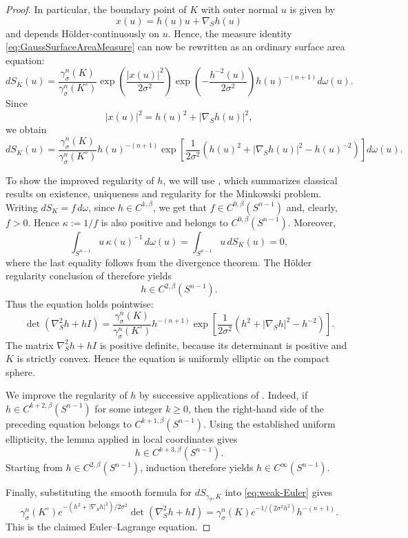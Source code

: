 \documentclass[12pt,oneside,reqno]{amsart}
\numberwithin{equation}{section}
\theoremstyle{remark}
\begin{document}
\begin{proof}
In particular, the boundary point of $K$ with outer
normal \(u\) is given by
\[
        x(u)=h(u)u+\nabla_Sh(u)
\]
and depends Hölder-continuously on \(u\). Hence, the measure identity \eqref{eq:GaussSurfaceAreaMeasure} can now be rewritten as an ordinary surface area
equation:
\[
        dS_{K}(u)
        =
        \frac{\gamma_\sigma^n(K)}{\gamma_\sigma^n(K^\circ)} 
        \exp\left( \frac{|x(u)|^2}{2\sigma^2}\right)
        \exp\left(-\frac{h^{-2}(u)}{2\sigma^2} \right)
        h(u)^{-(n+1)}
        d\omega(u).
\]
Since
\[
        |x(u)|^2=h(u)^2+|\nabla_Sh(u)|^2,
\]
we obtain
\[
        dS_{K}(u) =
        \frac{\gamma_\sigma^n(K)}{\gamma_\sigma^n(K^\circ)}
        h(u)^{-(n+1)}
        \exp\left[
        \frac{1}{2\sigma^2}
        \left(
        h(u)^2+|\nabla_Sh(u)|^2-h(u)^{-2}
        \right)
        \right] d\omega (u).
\]

To show the improved regularity of $h$, we will use \cite[Theorem~4.5]{trudinger2008monge}, which summarizes classical results on existence, uniqueness and regularity for the Minkowski problem. 
Writing \(dS_K=f\,d\omega\), since \(h\in C^{1,\beta}\),  we get that
\(f\in C^{0,\beta}( S^{n-1})\) and, clearly, \(f>0\). Hence
\(\kappa:=1/f\) is also positive and belongs to
\(C^{0,\beta}( S^{n-1})\). Moreover,
\[
    \int_{ S^{n-1}}u\,\kappa(u)^{-1}\,d\omega(u)
    =
    \int_{ S^{n-1}}u\,dS_K(u)
    =0,
\]
where the last equality follows from the divergence theorem.
The Hölder regularity conclusion of
\cite[Theorem~4.5]{trudinger2008monge} therefore yields
\[
    h\in C^{2,\beta}( S^{n-1}).
\]
Thus the equation holds pointwise:
\[
        \det(\nabla_S^2h+hI)
        =
        \frac{\gamma_\sigma^n(K)}{\gamma_\sigma^n(K^\circ)}
        h^{-(n+1)}
        \exp\left[
        \frac{1}{2\sigma^2}
        \left(
        h^2+|\nabla_Sh|^2-h^{-2}
        \right)
        \right].
\]
The matrix \(\nabla_S^2h+hI\) is positive definite, because its
determinant is positive and \(K\) is strictly convex.
Hence the equation is uniformly elliptic on the compact sphere. 

 


We improve the regularity of \(h\) by successive applications of
\cite[Lemma~17.16]{GilbargTrudinger}. Indeed, if
\(h\in C^{k+2,\beta}( S^{n-1})\) for some integer \(k\ge0\),
then the right-hand side of the preceding equation belongs to
\(C^{k+1,\beta}( S^{n-1})\). Using the established uniform ellipticity, the lemma applied in local coordinates gives
\[
    h\in C^{k+3,\beta}(S^{n-1}).
\]
Starting from \(h\in C^{2,\beta}( S^{n-1})\), induction
therefore yields \(h\in C^\infty( S^{n-1})\).






Finally, substituting the smooth formula for \(dS_{\gamma_\sigma,K}\) into \eqref{eq:weak-Euler} gives
\[
      {\gamma_\sigma^n(K^\circ)} e^{-(h^2+|\nabla_Sh|^2)/2\sigma^2}
        \det(\nabla_S^2h+hI)
        =
       {\gamma_\sigma^n(K)} e^{-1/(2\sigma^2h^2)}h^{-(n+1)}.
\]
This is the claimed Euler--Lagrange equation.
\end{proof}
 
\end{document}
